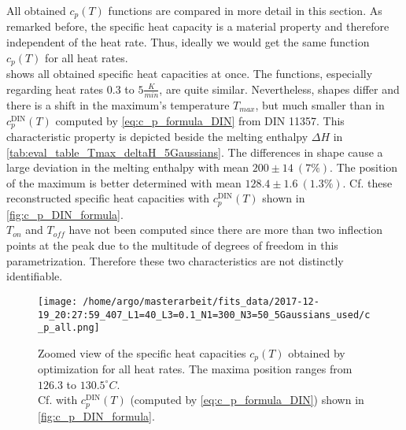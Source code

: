 \documentclass{scrartcl}[12pt, halfparskip]
\numberwithin{equation}{section}
\numberwithin{figure}{section}
\numberwithin{table}{section}
\begin{document}
All obtained $c_p(T)$ functions are compared in more detail in this section. As remarked before, the specific heat capacity is a material property and therefore independent of the heat rate. Thus, ideally we would get the same function $c_p(T)$ for all heat rates. \\
 shows all obtained specific heat capacities at once. 
The functions, especially regarding heat rates $0.3$ to $5 \frac{K}{min}$, are quite similar. 
Nevertheless, shapes differ and there is a shift in the maximum's temperature $T_{max}$, but much smaller than in $c_p^{\text{DIN}}(T)$ computed by \cref{eq:c_p_formula_DIN} from DIN 11357. This characteristic property is depicted beside the melting enthalpy $\Delta H$ in \cref{tab:eval_table_Tmax_deltaH_5Gaussians}. The differences in shape cause a large deviation in the melting enthalpy with mean $200 \pm 14 \ (7\%)$. The position of the maximum is better determined with mean $128.4 \pm 1.6 \ (1.3\%)$. Cf. these reconstructed specific heat capacities with $c_p^{\text{DIN}}(T)$ shown in \cref{fig:c_p_DIN_formula}. \\
$T_{on}$ and $T_{off}$ have not been computed since there are more than two inflection points at the peak due to the multitude of degrees of freedom in this parametrization. Therefore these two characteristics are not distinctly identifiable.



\begin{figure}[H]
	\centering
	\texttt{[image: /home/argo/masterarbeit/fits\_data/2017-12-19\_20:27:59\_407\_L1=40\_L3=0.1\_N1=300\_N3=50\_5Gaussians\_used/c\_p\_all.png]}
	\caption{Zoomed view of the specific heat capacities $c_p(T)$ obtained by optimization for all heat rates. The maxima position ranges from $126.3$ to $130.5^{\circ}C$. \\
	Cf. with $c_p^{\text{DIN}}(T)$ (computed by \cref{eq:c_p_formula_DIN}) shown in \cref{fig:c_p_DIN_formula}.}
	\label{fig:5Gaussians_all_c_p}
\end{figure}
\end{document}
